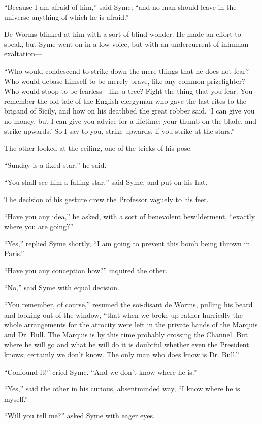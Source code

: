 “Because I am afraid of him,” said Syme; “and no man should leave in the universe anything of which he is afraid.”

De Worms blinked at him with a sort of blind wonder. He made an effort to speak, but Syme went on in a low voice, but with an undercurrent of inhuman exaltation⁠—

“Who would condescend to strike down the mere things that he does not fear? Who would debase himself to be merely brave, like any common prizefighter? Who would stoop to be fearless⁠—like a tree? Fight the thing that you fear. You remember the old tale of the English clergyman who gave the last rites to the brigand of Sicily, and how on his deathbed the great robber said, ‘I can give you no money, but I can give you advice for a lifetime: your thumb on the blade, and strike upwards.’ So I say to you, strike upwards, if you strike at the stars.”

The other looked at the ceiling, one of the tricks of his pose.

“Sunday is a fixed star,” he said.

“You shall see him a falling star,” said Syme, and put on his hat.

The decision of his gesture drew the Professor vaguely to his feet.

“Have you any idea,” he asked, with a sort of benevolent bewilderment, “exactly where you are going?”

“Yes,” replied Syme shortly, “I am going to prevent this bomb being thrown in Paris.”

“Have you any conception how?” inquired the other.

“No,” said Syme with equal decision.

“You remember, of course,” resumed the soi-disant de Worms, pulling his beard and looking out of the window, “that when we broke up rather hurriedly the whole arrangements for the atrocity were left in the private hands of the Marquis and Dr. Bull. The Marquis is by this time probably crossing the Channel. But where he will go and what he will do it is doubtful whether even the President knows; certainly we don’t know. The only man who does know is Dr. Bull.”

“Confound it!” cried Syme. “And we don’t know where he is.”

“Yes,” said the other in his curious, absentminded way, “I know where he is myself.”

“Will you tell me?” asked Syme with eager eyes.

